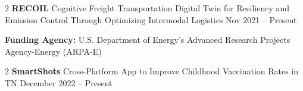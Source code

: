 \documentclass[10pt, letterpaper]{article}
\newenvironment{highlights}{
    \begin{itemize}[
        topsep=0.10 cm,
        parsep=0.10 cm,
        partopsep=0pt,
        itemsep=0pt,
        leftmargin=0 cm + 10pt
    ]
}{
    \end{itemize}
} %
\newenvironment{twocolentry}[2][]{
    \onecolentry
    \def\secondColumn{#2}
    \setcolumnwidth{\fill, 4.5 cm}
    \begin{paracol}{2}
}{
    \switchcolumn \raggedleft \secondColumn
    \end{paracol}
    \endonecolentry
} %
\begin{document}
        \begin{twocolentry}{Nov 2021 – Present} \textbf{RECOIL} \textbar Cognitive Freight Transportation Digital Twin for Resiliency and Emission Control Through Optimizing Intermodal Logistics \end{twocolentry} 
            \textbf{Funding Agency:} U.S. Department of Energy’s Advanced Research Projects Agency-Energy (ARPA-E) 
\vspace{0.3cm} 
        \begin{twocolentry}{December 2022 – Present} \textbf{SmartShots} \textbar Cross-Platform App to Improve Childhood Vaccination Rates in TN \end{twocolentry}
\end{document}
